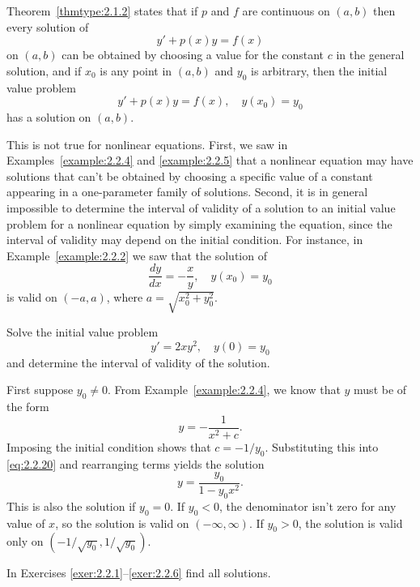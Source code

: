 
\noindent
Theorem~\ref{thmtype:2.1.2} states that if $p$ and $f$ are continuous on $(a,b)$ then every solution
of
\[
  y'+p(x)y=f(x)
\]
on $(a,b)$ can be obtained by choosing a value for the constant $c$ in the general solution, and if
$x_{0}$ is any point in $(a,b)$ and $y_{0}$ is arbitrary, then the initial value problem
\[
  y'+p(x)y=f(x),\quad y(x_{0})=y_{0}
\]
has a solution on $(a,b)$.

This is not true for nonlinear equations. First, we saw in Examples~\ref{example:2.2.4} and
\ref{example:2.2.5} that a nonlinear equation may have solutions that can't be obtained by choosing
a specific value of a constant appearing in a one-parameter family of solutions. Second, it is in
general impossible to determine the interval of validity of a solution to an initial value problem
for a nonlinear equation by simply examining the equation, since the interval of validity may depend
on the initial condition. For instance, in Example~\ref{example:2.2.2} we saw that the solution of
\[
  \frac{dy}{dx}=-\frac{x}{y},\quad y(x_{0})=y_{0}
\]
is valid on $(-a,a)$, where $a=\sqrt{x_{0}^{2}+y_{0}^{2}}$.

\begin{example}
  \label{example:2.2.6} \rm Solve the initial value problem
  \[
    y'=2xy^{2},\quad y(0)=y_{0}
  \]
  and determine the interval of validity of the solution.
\end{example}

\begin{examplesolution}
\solution First suppose $y_{0}\ne0$. From Example~\ref{example:2.2.4}, we know that $y$ must be of
the form
\begin{equation}
  \label{eq:2.2.20}y=-\frac{1}{x^{2}+c}.
\end{equation}
Imposing the initial condition shows that $c=-1/y_{0}$. Substituting this into \eqref{eq:2.2.20} and
rearranging terms yields the solution
\[
  y=\frac{y_{0}}{1-y_{0}x^{2}}.
\]
This is also the solution if $y_{0}=0$. If $y_{0}<0$, the denominator isn't zero for any value of
$x$, so the solution is valid on $(-\infty,\infty)$. If $y_{0}>0$, the solution is valid only on
$(-1/\sqrt{y_{0}},1/\sqrt{y_{0}})$.
\end{examplesolution}

\exercises In Exercises \ref{exer:2.2.1}--\ref{exer:2.2.6} find all solutions.

